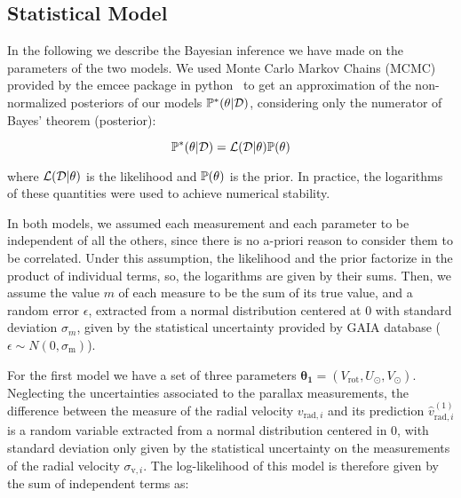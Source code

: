 \subsection{Statistical Model}\label{subsec:StatisticalModel}
In the following we describe the Bayesian inference we have made on the parameters of the two models. 
We used Monte Carlo Markov Chains (MCMC) provided by the emcee package in python~\cite{EMCEE} to get an approximation of the non-normalized posteriors of our models $\mathbb{P}^{*}(\theta \vert \mathcal{D})$, considering only the numerator of Bayes' theorem (posterior):

\begin{equation}\label{Eq:NonNormPosterior}
    \mathbb{P}^{*}(\theta \vert \mathcal{D}) = \mathcal{L}(\mathcal{D} \vert \theta) \mathbb{P}(\theta)
\end{equation}

\noindent where $\mathcal{L}(\mathcal{D} \vert \theta)$ is the likelihood and $\mathbb{P}(\theta)$ is the prior. In practice, the logarithms of these quantities were used to achieve numerical stability.

In both models, we assumed each measurement and each parameter to be independent of all the others, since there is no a-priori reason to consider them to be correlated. Under this assumption, the likelihood and the prior factorize in the product of individual terms, so, the logarithms are given by their sums. Then, we assume the value $m$ of each measure to be  the sum of its true value, and a random error $\epsilon$, extracted from a normal distribution centered at 0 with standard deviation $\sigma_m$, given by the statistical uncertainty provided by GAIA database ($\epsilon \sim N(0, \sigma_\text{m})$).

For the first model we have a set of three parameters $\mathbf{\theta_1} = (V_{\text{rot}}, U_{\odot}, V_{\odot})$. 
Neglecting the uncertainties associated to the parallax measurements, the difference between the measure of the radial velocity $v_{\text{rad}, i}$ and its prediction $\hat{v}^{(1)}_{\text{rad}, i}$ is a random variable extracted from a normal distribution centered in 0, with standard deviation only given by the statistical uncertainty on the measurements of the radial velocity $\sigma_{\text{v},i}$. 
The log-likelihood of this model is therefore given by the sum of independent terms as:

